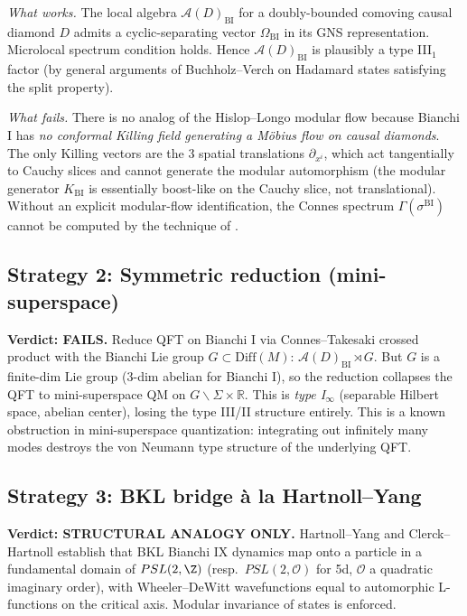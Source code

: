 \documentclass[11pt]{article}
\theoremstyle{definition}
\newcommand{\R}{\mathbb{R}}
\renewcommand{\AA}{\mathcal{A}}
\newcommand{\OO}{\mathcal{O}}
\newcommand{\BI}{\mathrm{BI}}
\begin{document}
\smallskip\noindent\emph{What works.}
The local algebra $\AA(D)_\BI$ for a doubly-bounded comoving causal
diamond $D$ admits a cyclic-separating vector $\Omega_\BI$ in its GNS
representation. Microlocal spectrum condition
\cite{BrunettiFredenhagenVerch2003} holds. Hence $\AA(D)_\BI$ is
plausibly a type III$_1$ factor (by general arguments of
Buchholz--Verch on Hadamard states satisfying the split property).

\smallskip\noindent\emph{What fails.}
There is no analog of the Hislop--Longo modular flow because Bianchi I
has \emph{no conformal Killing field generating a M\"obius flow on
causal diamonds}. The only Killing vectors are the 3 spatial
translations $\partial_{x^i}$, which act tangentially to Cauchy slices
and cannot generate the modular automorphism (the modular generator
$K_\BI$ is essentially boost-like on the Cauchy slice, not translational).
Without an explicit modular-flow identification, the Connes spectrum
$\Gamma(\sigma^\BI)$ cannot be computed by the technique of
\cite{frw_note}.

\subsection{Strategy 2: Symmetric reduction (mini-superspace)}

\textbf{Verdict: FAILS.}
Reduce QFT on Bianchi I via Connes--Takesaki crossed product with the
Bianchi Lie group $G\subset\mathrm{Diff}(M)$:
$\AA(D)_\BI \rtimes G$. But $G$ is a finite-dim Lie group (3-dim
abelian for Bianchi I), so the reduction collapses the QFT to
mini-superspace QM on $G\backslash\Sigma\times\R$. This is
\emph{type I$_\infty$} (separable Hilbert space, abelian center),
losing the type III/II structure entirely. This is a known obstruction
in mini-superspace quantization: integrating out
infinitely many modes destroys the von Neumann type structure of the
underlying QFT.

\subsection{Strategy 3: BKL bridge \`a la Hartnoll--Yang}

\textbf{Verdict: STRUCTURAL ANALOGY ONLY.}
Hartnoll--Yang \cite{HartnollYang2025} and Clerck--Hartnoll
\cite{ClerckHartnoll2025} establish that BKL Bianchi IX dynamics map
onto a particle in a fundamental domain of $PSL(2,\Z)$ (resp.\
$PSL(2,\OO)$ for 5d, $\OO$ a quadratic imaginary order), with
Wheeler--DeWitt wavefunctions equal to automorphic L-functions on the
critical axis. Modular invariance of states is enforced.
\end{document}
